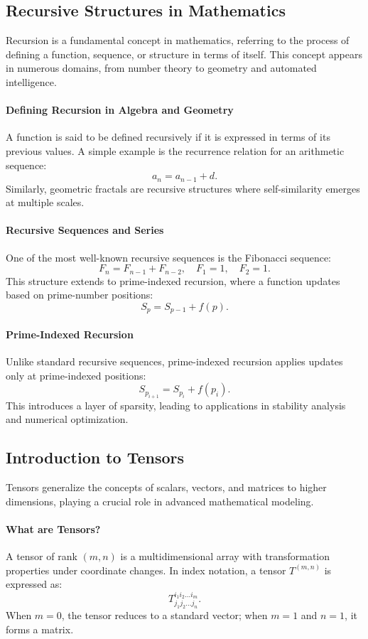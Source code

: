 \documentclass{article}
\theoremstyle{plain}
\begin{document}
\subsection{Recursive Structures in Mathematics}

Recursion is a fundamental concept in mathematics, referring to the process of defining a function, sequence, or structure in terms of itself. This concept appears in numerous domains, from number theory to geometry and automated intelligence.

\paragraph{Defining Recursion in Algebra and Geometry}
A function is said to be defined recursively if it is expressed in terms of its previous values. A simple example is the recurrence relation for an arithmetic sequence:
\[
a_n = a_{n-1} + d.
\]
Similarly, geometric fractals are recursive structures where self-similarity emerges at multiple scales.

\paragraph{Recursive Sequences and Series}
One of the most well-known recursive sequences is the Fibonacci sequence:
\[
F_n = F_{n-1} + F_{n-2}, \quad F_1 = 1, \quad F_2 = 1.
\]
This structure extends to prime-indexed recursion, where a function updates based on prime-number positions:
\[
S_p = S_{p-1} + f(p).
\]

\paragraph{Prime-Indexed Recursion}
Unlike standard recursive sequences, prime-indexed recursion applies updates only at prime-indexed positions:
\[
S_{p_{i+1}} = S_{p_i} + f(p_i).
\]
This introduces a layer of sparsity, leading to applications in stability analysis and numerical optimization.

\subsection{Introduction to Tensors}

Tensors generalize the concepts of scalars, vectors, and matrices to higher dimensions, playing a crucial role in advanced mathematical modeling.

\paragraph{What are Tensors?}
A tensor of rank \( (m, n) \) is a multidimensional array with transformation properties under coordinate changes. In index notation, a tensor \( T^{(m,n)} \) is expressed as:
\[
T^{i_1 i_2 \dots i_m}_{j_1 j_2 \dots j_n}.
\]
When \( m = 0 \), the tensor reduces to a standard vector; when \( m = 1 \) and \( n = 1 \), it forms a matrix.
\end{document}

